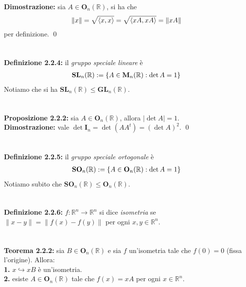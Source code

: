 \documentclass{article}
\begin{document}
\textbf{Dimostrazione:} sia $A \in \mathbf{O}_n(\mathbb{R})$, si ha che
\begin{gather}
    \| x \| = \sqrt{\langle x, x \rangle} = \sqrt{\langle xA, xA \rangle} = \| xA \| \notag
\end{gather}
per definizione. \qed \\ \\ \\
\textbf{Definizione 2.2.4:} il \textit{gruppo speciale lineare} è
\begin{gather}
    \mathbf{SL}_n(\mathbb{R}) := \{ A \in \mathbf{M}_n(\mathbb{R}) : \det A = 1 \} \notag
\end{gather}
Notiamo che si ha $\mathbf{SL}_n(\mathbb{R}) \leq \mathbf{GL}_n(\mathbb{R})$. \\ \\ \\
\textbf{Proposizione 2.2.2:} sia $A \in \mathbf{O}_n(\mathbb{R})$, allora $|\det A| = 1$. \\

\textbf{Dimostrazione:} vale $\det \mathbf{I}_n = \det (AA^t) = (\det A)^2$. \qed \\ \\ \\
\textbf{Definizione 2.2.5:} il \textit{gruppo speciale ortogonale} è
\begin{gather}
    \mathbf{SO}_n(\mathbb{R}) := \{ A \in \mathbf{O}_n(\mathbb{R}) : \det A = 1 \} \notag
\end{gather}
Notiamo subito che $\mathbf{SO}_n(\mathbb{R}) \leq \mathbf{O}_n(\mathbb{R})$. \\ \\ \\
\textbf{Definizione 2.2.6:} $f : \mathbb{R}^n \longrightarrow \mathbb{R}^n$ si dice \textit{isometria} se $\| x - y \| = \| f(x) - f(y) \|$ per ogni $x, y \in \mathbb{R}^n$. \\ \\ \\
\textbf{Teorema 2.2.2:} sia $B \in \mathbf{O}_n(\mathbb{R})$ e sia $f$ un'isometria tale che $f(0) = 0$ (fissa l'origine). Allora: \\
\textbf{1.} $x \hookrightarrow xB$ è un'isometria. \\
\textbf{2.} esiste $A \in \mathbf{O}_n(\mathbb{R})$ tale che $f(x) = xA$ per ogni $x \in \mathbb{R}^n$. \\
\end{document}
